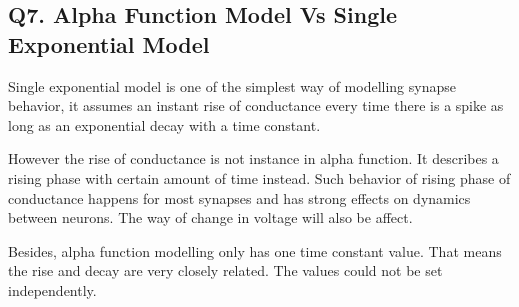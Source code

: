 \documentclass[DIV=calc, paper=a4, fontsize=12pt, twocolumn]{article}	 %
\begin{document}
    \subsection*{Q7. Alpha Function Model Vs Single Exponential Model}
	Single exponential model is one of the simplest way of modelling synapse behavior, it assumes an instant rise of conductance every time there is a spike as long as an exponential decay with a time constant.
	\par 
	However the rise of conductance is not instance in alpha function. It describes a rising phase with certain amount of time instead. Such behavior of rising phase of conductance happens for most synapses and has strong effects on dynamics between neurons. The way of change in voltage will also be affect.
	\par    
	Besides, alpha function modelling only has one time constant value. That means the rise and decay are very closely related. The values could not be set independently.
	
\end{document}
